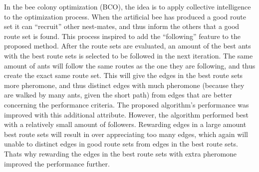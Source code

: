 In the bee colony optimization (BCO), the idea is to apply collective intelligence to the optimization process. When the artificial bee has produced a good route set it can ``recruit'' other nest-mates, and thus inform the others that a good route set is found. This process inspired to add the ``following'' feature to the proposed method. After the route sets are evaluated, an amount of the best ants with the best route sets is selected to be followed in the next iteration. The same amount of ants will follow the same routes as the one they are following, and thus create the exact same route set. This will give the edges in the best route sets more pheromone, and thus distinct edges with much pheromone (because they are walked by many ants, given the short path) from edges that are better concerning the performance criteria. The proposed algorithm's performance was improved with this additional attribute. However, the algorithm performed best with a relatively small amount of followers. Rewarding edges in a large amount best route sets will result in over appreciating too many edges, which again will unable to distinct edges in good route sets from edges in the best route sets. Thats why rewarding the edges in the best route sets with extra pheromone improved the performance further.  %



